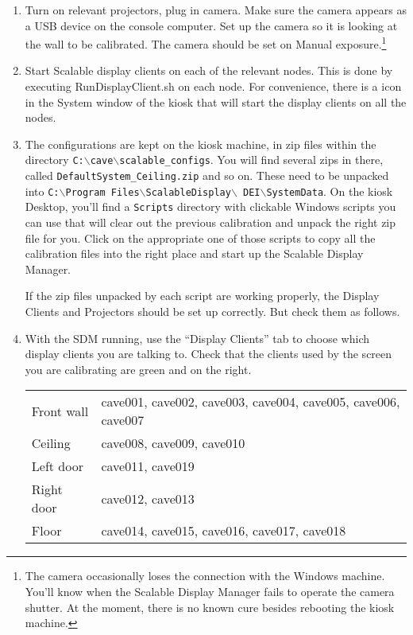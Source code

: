 \documentclass[11pt]{article}
\newcommand{\cmd}[1]{\texttt{#1}\xspace}
\newcommand{\menu}[1]{``#1''\xspace}
\newcommand{\button}[1]{\framebox{\textsf{#1}\xspace}}
\newcommand{\bs}{$\backslash$}
\begin{document}
\begin{enumerate}

\item Turn on relevant projectors, plug in camera.  Make sure the camera
  appears as a USB device on the console computer.  Set up the camera
  so it is looking at the wall to be calibrated.  The camera should be
  set on Manual exposure.\footnote{The camera occasionally loses the
    connection with the Windows machine.  You'll know when the
    Scalable Display Manager fails to operate the camera shutter.  At
    the moment, there is no known cure besides rebooting the kiosk
    machine.} 

\item Start Scalable display clients on each of the relevant nodes.
  This is done by executing RunDisplayClient.sh on each node.  For
  convenience, there is a \button{Calibrate} icon in the System window of
  the kiosk that will start the display clients on all the nodes.

\item The configurations are kept on the kiosk machine, in zip files
  within the directory \hbox{\cmd{C:\bs cave\bs scalable\_configs}}.
  You will find several zips in there, called
  \cmd{DefaultSystem\_Ceiling.zip} and so on.  These need to be
  unpacked into \hbox{\cmd{C:\bs Program Files\bs ScalableDisplay\bs
      DEI\bs SystemData}}.  On the kiosk Desktop, you'll find a
  \cmd{Scripts} directory with clickable Windows scripts you can use
  that will clear out the previous calibration and unpack the right
  zip file for you.  Click on the appropriate one of those scripts to
  copy all the calibration files into the right place and start up the
  Scalable Display Manager.

  If the zip files unpacked by each script are working properly, the
  Display Clients and Projectors should be set up correctly.  But
  check them as follows.

\item With the SDM running, use the \menu{Display Clients} tab to choose
  which display clients you are talking to.  Check that the clients
  used by the screen you are calibrating are 
  green and on the right. 

  \begin{center}
  \begin{tabular}{ll}
    Front wall & cave001, cave002, cave003, cave004, cave005, cave006,
                 cave007 \\
    Ceiling & cave008, cave009, cave010 \\
    Left door & cave011, cave019 \\
    Right door & cave012, cave013 \\
    Floor & cave014, cave015, cave016, cave017, cave018 \\ 
  \end{tabular}
\end{center}


\end{enumerate}
\end{document}
